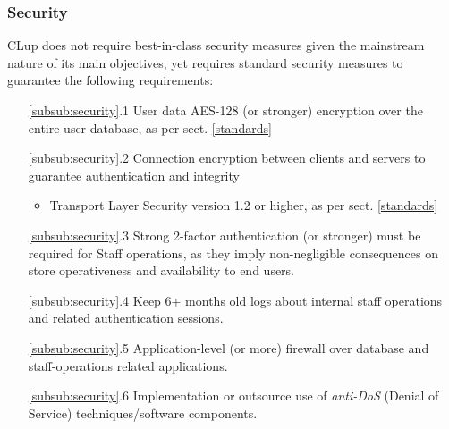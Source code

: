 \subsubsection{Security \label{subsub:security}}
CLup does not require best-in-class security measures given the mainstream nature of its main objectives, yet requires standard security measures to guarantee the following requirements:\newline
\begin{itemize}[leftmargin=+.8in]
    \item[\ref{subsub:security}.1] User data AES-128 (or stronger) encryption over the entire user database, as per sect. \ref{standards}
    \item[\ref{subsub:security}.2] Connection encryption between clients and servers to guarantee authentication and integrity 
    \begin{itemize}
        \item Transport Layer Security version 1.2 or higher, as per sect. \ref{standards}
    \end{itemize}
    \item[\ref{subsub:security}.3] Strong 2-factor authentication (or stronger) must be required for Staff operations, as they imply non-negligible consequences on store operativeness and availability to end users.
    \item[\ref{subsub:security}.4] Keep 6+ months old logs about internal staff operations and related authentication sessions.
    \item[\ref{subsub:security}.5] Application-level (or more) firewall over database and staff-operations related applications.
    \item[\ref{subsub:security}.6] Implementation or outsource use of \textit{anti-DoS} (Denial of Service) techniques/software components.
\end{itemize}

